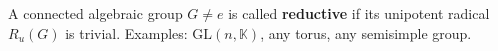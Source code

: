 A connected algebraic group $G \neq e$ is called \textbf{reductive} if its unipotent radical $R_u(G)$ is trivial. Examples: $\text{GL}(n, \mathbb{K})$, any torus, any semisimple group.
